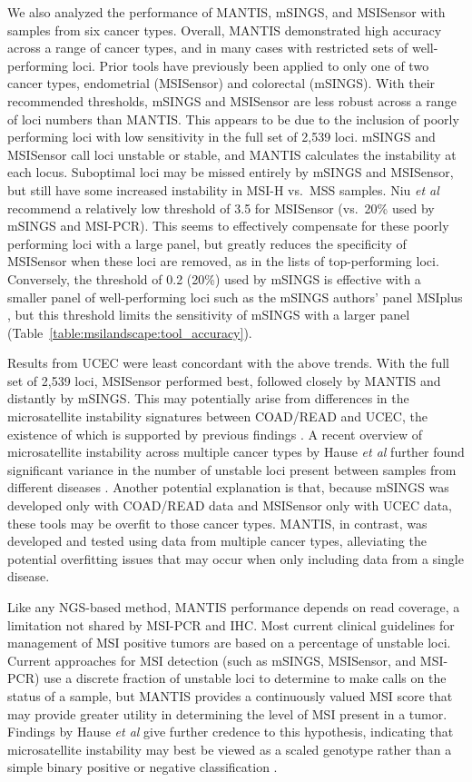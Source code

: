 We also analyzed the performance of MANTIS, mSINGS, and MSISensor with samples from six cancer types. Overall, MANTIS demonstrated high accuracy across a range of cancer types, and in many cases with restricted sets of well-performing loci. Prior tools have previously been applied to only one of two cancer types, endometrial (MSISensor) and colorectal (mSINGS)\@. With their recommended thresholds, mSINGS and MSISensor are less robust across a range of loci numbers than MANTIS\@. This appears to be due to the inclusion of poorly performing loci with low sensitivity in the full set of 2,539 loci. mSINGS and MSISensor call loci unstable or stable, and MANTIS calculates the instability at each locus. Suboptimal loci may be missed entirely by mSINGS and MSISensor, but still have some increased instability in MSI-H vs.\ MSS samples. Niu \textit{et al} recommend a relatively low threshold of 3.5 for MSISensor (vs.\ 20\% used by mSINGS and MSI-PCR)\@. This seems to effectively compensate for these poorly performing loci with a large panel, but greatly reduces the specificity of MSISensor when these loci are removed, as in the lists of top-performing loci. Conversely, the threshold of 0.2 (20\%) used by mSINGS is effective with a smaller panel of well-performing loci such as the mSINGS authors' panel MSIplus \cite{hempelmann2015}, but this threshold limits the sensitivity of mSINGS with a larger panel (Table~\ref{table:msilandscape:tool_accuracy}).

Results from UCEC were least concordant with the above trends. With the full set of 2,539 loci, MSISensor performed best, followed closely by MANTIS and distantly by mSINGS\@. This may potentially arise from differences in the microsatellite instability signatures between COAD/READ and UCEC, the existence of which is supported by previous findings \cite{alhopuro2012,kim2013}. A recent overview of microsatellite instability across multiple cancer types by Hause \textit{et al} further found significant variance in the number of unstable loci present between samples from different diseases \cite{hause2016}. Another potential explanation is that, because mSINGS was developed only with COAD/READ data and MSISensor only with UCEC data, these tools may be overfit to those cancer types. MANTIS, in contrast, was developed and tested using data from multiple cancer types, alleviating the potential overfitting issues that may occur when only including data from a single disease.

Like any NGS-based method, MANTIS performance depends on read coverage, a limitation not shared by MSI-PCR and IHC\@. Most current clinical guidelines for management of MSI positive tumors are based on a percentage of unstable loci. Current approaches for MSI detection (such as mSINGS, MSISensor, and MSI-PCR) use a discrete fraction of unstable loci to determine to make calls on the status of a sample, but MANTIS provides a continuously valued MSI score that may provide greater utility in determining the level of MSI present in a tumor. Findings by Hause \textit{et al} give further credence to this hypothesis, indicating that microsatellite instability may best be viewed as a scaled genotype rather than a simple binary positive or negative classification \cite{hause2016}.

